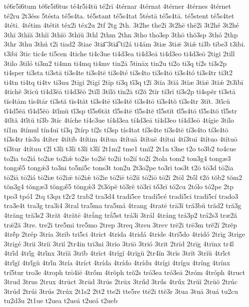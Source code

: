 {té6r5i6tum
té6r5i6tus
té4r5i4tū
té2rī
4térnar
4térnat
4térner
4térnes
4térnet
té2ru
2t3éss
5tésta
té5s4ta.
té5stant
té5s4tat
5téstā
té5s4tā.
té5stent
té5s4tet
4téti.
4tétim
4tétit
téx2i
téx2u
2tf
2tg
2th.
3t2he
the2i
3t2hē
thē2i
3t2hĕ
3t2hé
3thī
3thĭă
3thĭī
3thĭō
3thĭŭ
3thl
2thm
2thn
3tho
tho3sp
3thō
thŏ3sp
3thó
2thp
3thr
3thu
3thú
t2i
tiad2
3tiae
3tia͞
3tia͡
ti2á
ti4ám
3tiæ
3tiǣ
3tiǽ
ti3b
tibe3
t3ibi.
t3ibī
3tic
tic4e
ti5cen
4tiche
ti4c3ue
ti4d3ea
ti4d3eā
ti4d3eo
ti4d3eō
2tigi
2till
3tilo
3tiló
ti3m2
ti4mn
ti4mq
ti4mv
tin2ā
5tināx
tin2u
ti2o
ti3q
ti2s
ti3s2p
ti4sper
ti3sta
ti3stā
ti3s4te
ti3s4tē
ti3s4té
ti3s4to
ti3s4tō
ti3s4tó
ti3s4tr
ti3t2
ti4tn
ti4tq
ti4tv
ti3uu
2tīgi
2tīgĭ
2tīp
tī3q
tī́3q
t2ĭ
3tĭa
3tĭá
3tĭæ
3tĭǣ
3tĭǽ
2t3ĭbī
4tĭchĕ
3tĭcŭ
tĭ4d3ĕā
tĭ4d3ĕō
2tĭll
3tĭlŏ
tĭn2ā
tĭ2ŏ
2tĭr
tĭ3rĭ
tĭ3s2p
tĭ4spĕr
tĭ3stā
tĭs4tām
tĭs4tār
tĭ3stă
tĭs4tăt
tĭ3s4tē
tĭ3s4tĕ
tĭ3s4tō
tĭ3s4tŏ
tĭ3s4tr
3tĭt.
3tĭ́cŭ
tĭ́4d5ĕā
tĭ́4d5ĕō
4tĭ́mŭ
tĭ́3sp
tĭ́5s6tăt
tĭ́5s4tē
tĭ́5s4tĕ
tĭ́5stĭt
tĭ́5s4tō
tĭ́5s4tŏ
tĭ́5str
4tĭ́tă
4tĭ́tŭ
tí3b
3tíc
4tíche
tí4c3ue
tí4d3ea
tí4d3eā
tí4d3eo
tí4d3eō
4tígie
3tílo
tí1m
4tímul
tín4uī
tí3q
2tírp
tí2s
tí3sp
tís4tat
tí3s4te
tí3s4tē
tí3s4to
tí3s4tō
tí3s4tr
tís3u
4títer
4títib
4títim
4títua
4títuā
4títuē
4títui
4tí3tuī
4títuo
4títuō
tí3tur
4títuu
t2l
t3li
t3lī
t3lĭ
t3lí
2t1m2
tme1
tmĭ2
2t1n
t3ne
t2o
to3b2
to4cue
to2ia
to2iá
to2iæ
to2iǽ
to2ie
to2ié
to2ii
to2ií
to2í
2tola
tom2
ton3g4
tongæ3
tongǣ́5
tongǽ3
to3ni
to5ni5c
tons3t
ton2u
2t3o2pe
to3rī
tos3t
t2ō
tō3d
tō2ia
tō2iā
tō2iá
tō2iæ
tō2iǣ
tō2iǽ
tō2ie
tō2iē
tō2iī
tō2iō
tō2ĭ
2tōl
2tṓl
t2ŏ
tŏb2
tŏm2
tŏn3g4
tŏngæ3
tŏngǣ́5
tŏngǽ3
2t3ŏpĕ
tŏ3rĕ
tŏ3rī
tŏ́3rĭ
tó2cu
2tólo
tó2pe
2tp
tpo3
tpó1
2tq
t3qu
t2r2
trab2
tra3d4
tradi5ce
tradi5cé
tradi5ci
tradi5cí
trado3
tra3e4t
tra3g
tra3i4
3tral
tra5ma
tra5má
4trang
4tratē
trā3ĭ
tră3bŭ
trăd2
tră3g
4trăng
tră3s2
3trăt
4trătē
4trắng
trắ5st
trá3i
3trál
4tráng
trá3p2
trá2s3
træ2ă
trǣ2ă
3tre.
tre2i
tre5mi
tre5mo
2trep
3treq
3treu
3trev
trē2i
trē3m
trĕ2ĭ
2trĕp
4trĕ́p
2trép
3tria
3trib
tri5ci
4trict
4trida
4tridá
4tride
4tri5do
4tridó
2trig
3trige
3trigé
3trii
3triī
3trií
2tr4in
tri3ni
3trio
3triō
3trió
3trit
2trīd
2trīg
4trīnx
tr4ī́
4trī́d
4trī́g
4trī́nx
3trĭă
3trĭb
4trĭct
4trĭgĭ
4trĭgŭ
2tr4ĭn
3trĭs
3trĭt
3trĭŭ
4trĭ́ct
4trĭ́gĭ
4trĭ́gŭ
4trĭ́n
3tría
4tríct
4trída
4trído
4trídu
4trígi
4trígu
4tríng
4trínx
trí5tur
tro3e
4troph
trō4iē
4trṓm
4trŏph
trŏ2s
tró3ea
tró3eā
2tróm
4tróph
4truct
3trud
3trus
2trux
4trūct
3trūd
3trūs
2trūx
3trū́d
3trū́s
4trū́x
2trŭĭ
2trŭŏ
2trúc
3trúd
2trúi
3trús
2trúx
2t1s2
2tt2
tte2i
tte5re
ttē2i
ttĕ3r
3tua
3tuā
3tuá
tu2cu
tu2d3u
2t1ue
t2uea
t2ueā
t2ueá
t2ueb
}
